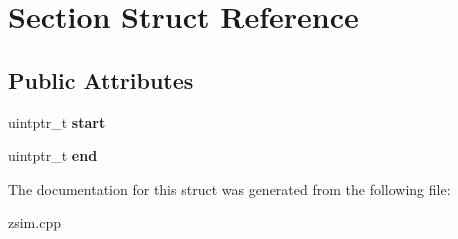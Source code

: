 \hypertarget{structSection}{\section{Section Struct Reference}
\label{structSection}
}
\subsection*{Public Attributes}
\begin{DoxyCompactItemize}
\item 
\hypertarget{structSection_abb0118ec507ba7f2c6151659c2abfbfd}{uintptr\-\_\-t {\bfseries start}}\label{structSection_abb0118ec507ba7f2c6151659c2abfbfd}

\item 
\hypertarget{structSection_af86cddd60f8955c1ca2608c550753abe}{uintptr\-\_\-t {\bfseries end}}\label{structSection_af86cddd60f8955c1ca2608c550753abe}

\end{DoxyCompactItemize}


The documentation for this struct was generated from the following file\-:\begin{DoxyCompactItemize}
\item 
zsim.\-cpp\end{DoxyCompactItemize}
